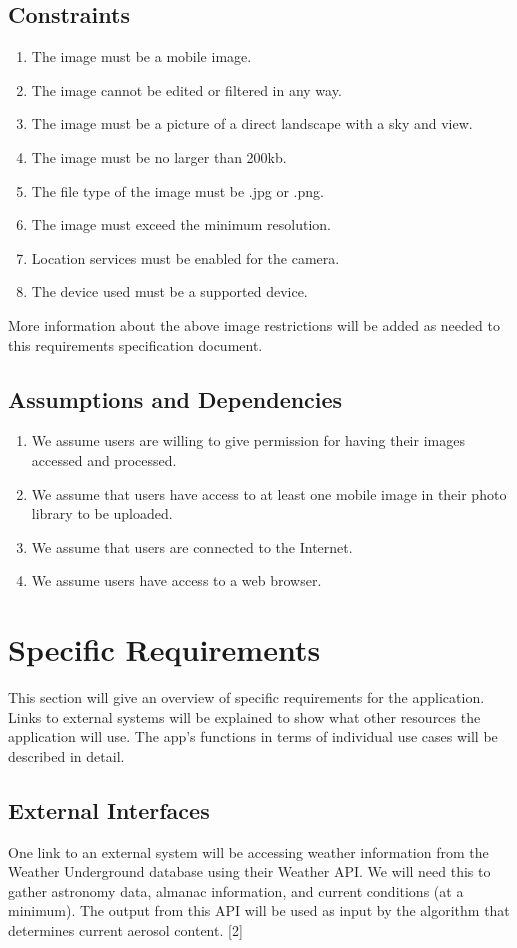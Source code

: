 \documentclass[letterpaper,10pt,draftclsnofoot,onecolumn]{IEEEtran}
\begin{document}
\begin{flushleft}
\subsection{Constraints}
\begin{enumerate}
        \item The image must be a mobile image.
        \item The image cannot be edited or filtered in any way.
        \item The image must be a picture of a direct landscape with a sky and view.
        \item The image must be no larger than 200kb.
        \item The file type of the image must be .jpg or .png.
        \item The image must exceed the minimum resolution.
        \item Location services must be enabled for the camera.
        \item The device used must be a supported device.
\end{enumerate}
More information about the above image restrictions will be added as needed to this requirements specification document.
\subsection{Assumptions and Dependencies}
\begin{enumerate}
	\item We assume users are willing to give permission for having their images accessed and processed.
	\item We assume that users have access to at least one mobile image in their photo library to be uploaded.
	\item We assume that users are connected to the Internet.
	\item We assume users have access to a web browser.
\end{enumerate}

\section{Specific Requirements}
This section will give an overview of specific requirements for the application. 
Links to external systems will be explained to show what other resources the application will use.
The app's functions in terms of individual use cases will be described in detail.

\subsection{External Interfaces}
One link to an external system will be accessing weather information from the Weather Underground database using their Weather API.  
We will need this to gather astronomy data, almanac information, and current conditions (at a minimum). 
The output from this API will be used as input by the algorithm that determines current aerosol content. [2]


\end{flushleft}
\end{document}
